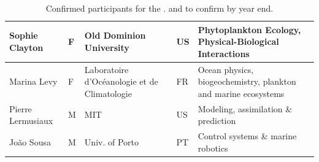 \begin{table}[H]
{\begin{tabular}{|p{3.5cm}|p{0.7cm}|p{4.0cm}|p{0.5cm}|p{6.0cm}|}
  \hline
  Sophie Clayton           & F   & Old Dominion University              & US       & Phytoplankton Ecology, Physical-Biological Interactions\\
  \hline
  Marina Levy              & F   & Laboratoire d'Oc\'{e}anologie et de Climatologie    & FR       & Ocean physics, biogeochemistry, plankton and marine ecosystems\\
  \hline
  Pierre Lermusiaux        & M   & MIT & US       &Modeling, assimilation \& prediction\\
  \hline
  Jo\~ao Sousa               & M   & Univ. of Porto & PT       &
                                                                 Control systems \& marine robotics                      \\
  \hline
\end{tabular}
}
\caption{Confirmed participants for the \sympe.  and  to confirm by year end.}
\label{tab:part}
\end{table}

